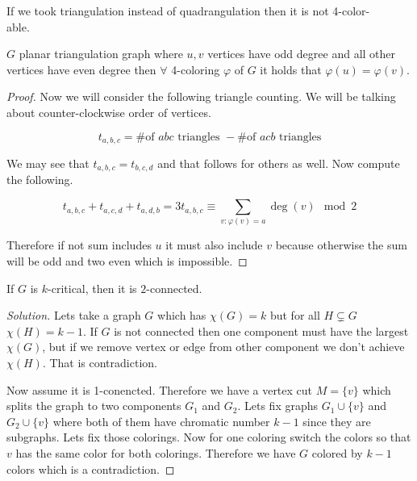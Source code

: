 \begin{observ}
	If we took triangulation instead of quadrangulation then it is not 4-color-\\able.
\end{observ}

\begin{lemma}
	$G$ planar triangulation graph where $u,v$ vertices have odd degree and all other vertices have even degree then $\forall$ 4-coloring $\varphi$ of $G$ it holds that $\varphi(u) = \varphi(v)$.
\end{lemma}

\begin{proof}
	Now we will consider the following triangle counting. We will be talking about counter-clockwise order of vertices.
	
	$$
	t_{a,b,c} = \text{\# of } abc \text{ triangles } - \text{\# of } acb \text{ triangles}
	$$
	
	We may see that $t_{a,b,c} = t_{b,c,d}$ and that follows for others as well. Now compute the following.
	
	$$
	t_{a,b,c} + t_{a,c,d} + t_{a,d,b} = 3 t_{a,b,c} \equiv \sum_{v : \varphi(v) = a} \deg(v) \mod 2
	$$
	
	Therefore if not sum includes $u$ it must also include $v$ because otherwise the sum will be odd and two even which is impossible.
\end{proof}

\begin{exerc}
	If $G$ is $k$-critical, then it is $2$-connected.
\end{exerc}

\begin{proof}[Solution]
	Lets take a graph $G$ which has $\chi(G) = k$ but for all $H \subsetneq G$ $\chi(H) = k-1$. If $G$ is not connected then one component must have the largest $\chi(G)$, but if we remove vertex or edge from other component we don't achieve $\chi(H)$. That is contradiction.
	
	Now assume it is 1-conencted. Therefore we have a vertex cut $M = \{v\}$ which splits the graph to two components $G_1$ and $G_2$. Lets fix graphs $G_1 \cup \{v\}$ and $G_2 \cup \{v\}$ where both of them have chromatic number $k - 1$ since they are subgraphs. Lets fix those colorings. Now for one coloring switch the colors so that $v$ has the same color for both colorings. Therefore we have $G$ colored by $k-1$ colors which is a contradiction.
\end{proof}


